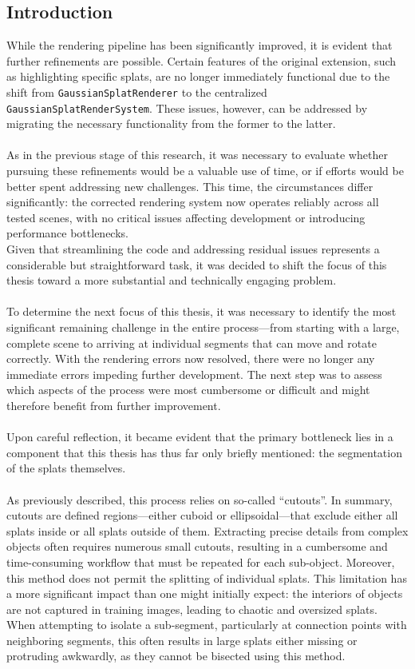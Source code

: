 \documentclass[12pt]{article}
\begin{document}
\subsection{Introduction}
While the rendering pipeline has been significantly improved, it is evident that further refinements are possible. Certain features of the original extension, such as highlighting specific splats, are no longer immediately functional due to the shift from \texttt{GaussianSplatRenderer} to the centralized \linebreak \texttt{GaussianSplatRenderSystem}. These issues, however, can be addressed by migrating the necessary functionality from the former to the latter.
\\\\
As in the previous stage of this research, it was necessary to evaluate whether pursuing these refinements would be a valuable use of time, or if efforts would be better spent addressing new challenges. This time, the circumstances differ significantly: the corrected rendering system now operates reliably across all tested scenes, with no critical issues affecting development or introducing performance bottlenecks.
\\
Given that streamlining the code and addressing residual issues represents a considerable but straightforward task, it was decided to shift the focus of this thesis toward a more substantial and technically engaging problem.  
\\\\
To determine the next focus of this thesis, it was necessary to identify the most significant remaining challenge in the entire process—from starting with a large, complete scene to arriving at individual segments that can move and rotate correctly. With the rendering errors now resolved, there were no longer any immediate errors impeding further development. The next step was to assess which aspects of the process were most cumbersome or difficult and might therefore benefit from further improvement.\\\\
Upon careful reflection, it became evident that the primary bottleneck lies in a component that this thesis has thus far only briefly mentioned: the segmentation of the splats themselves.
\\\\
As previously described, this process relies on so-called “cutouts”. In summary, cutouts are defined regions—either cuboid or ellipsoidal—that exclude either all splats inside or all splats outside of them. Extracting precise details from complex objects often requires numerous small cutouts, resulting in a cumbersome and time-consuming workflow that must be repeated for each sub-object. Moreover, this method does not permit the splitting of individual splats. This limitation has a more significant impact than one might initially expect: the interiors of objects are not captured in training images, leading to chaotic and oversized splats. When attempting to isolate a sub-segment, particularly at connection points with neighboring segments, this often results in large splats either missing or protruding awkwardly, as they cannot be bisected using this method.
\end{document}
